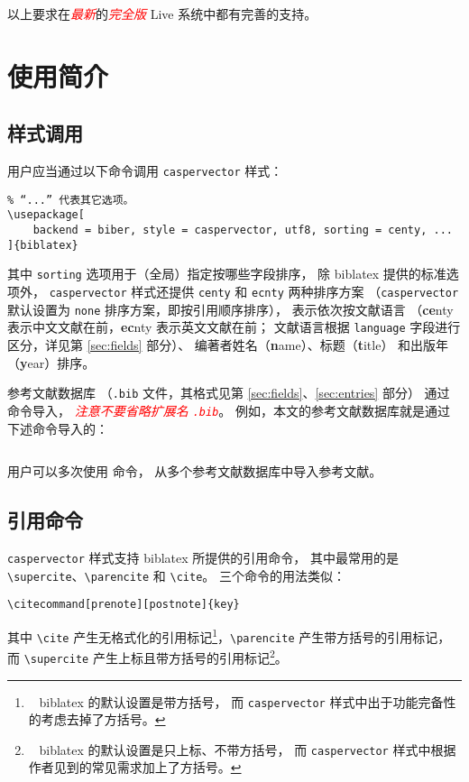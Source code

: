 \documentclass[UTF8]{ctexart}
\newcommand{\myemph}[1]{\emph{\textcolor{red}{#1}}}
\begin{document}
以上要求在\myemph{最新}的\myemph{完全版}
 Live 系统中都有完善的支持。

\section{使用简介}
\subsection{样式调用}

用户应当通过以下命令调用 \verb|caspervector| 样式：
\begin{Verbatim}[frame = single]
% “utf8”可能需要改为“gbk”，根据用户使用的字符编码而定。
% “...” 代表其它选项。
\usepackage[
	backend = biber, style = caspervector, utf8, sorting = centy, ...
]{biblatex}
\end{Verbatim}
其中 \verb|sorting| 选项用于（全局）指定按哪些字段排序，
除 biblatex 提供的标准选项\supercite{biblatex}外，%
\verb|caspervector| 样式还提供 \verb|centy| 和 \verb|ecnty| 两种排序方案
（\verb|caspervector| 默认设置为 \verb|none| 排序方案，即按引用顺序排序），
表示依次按文献语言
（\textbf{ce}nty 表示中文文献在前，\textbf{ec}nty 表示英文文献在前；
文献语言根据 \verb|language| 字段进行区分，详见第 \ref{sec:fields} 部分）、
编著者姓名（\textbf{n}ame）、标题（\textbf{t}itle）
和出版年（\textbf{y}ear）排序。

参考文献数据库
（\verb|.bib| 文件，其格式见第 \ref{sec:fields}、\ref{sec:entries} 部分）
通过 \verb|| 命令导入，%
\myemph{注意不要省略扩展名 \texttt{.bib}}。
例如，本文的参考文献数据库就是通过下述命令导入的：
\begin{Verbatim}[frame = single]

\end{Verbatim}
用户可以多次使用 \verb|| 命令，
从多个参考文献数据库中导入参考文献。

\subsection{引用命令}

\verb|caspervector| 样式支持 biblatex 所提供的引用命令，
其中最常用的是 \verb|\supercite|、\verb|\parencite| 和 \verb|\cite|。
三个命令的用法类似：
\begin{Verbatim}[frame = single]
% 可选参数 prenote 和 postnote 分别用于设定引用记号前、后的注释。
\citecommand[prenote][postnote]{key}
\end{Verbatim}
其中 \verb|\cite| 产生无格式化的引用标记\footnote{\ %
	biblatex 的默认设置是带方括号，
	而 \texttt{caspervector} 样式中出于功能完备性的考虑去掉了方括号。%
}，\verb|\parencite| 产生带方括号的引用标记，
而 \verb|\supercite| 产生上标且带方括号的引用标记\footnote{\ %
	biblatex 的默认设置是只上标、不带方括号，
	而 \texttt{caspervector} 样式中根据作者见到的常见需求加上了方括号。%
}。
\end{document}

